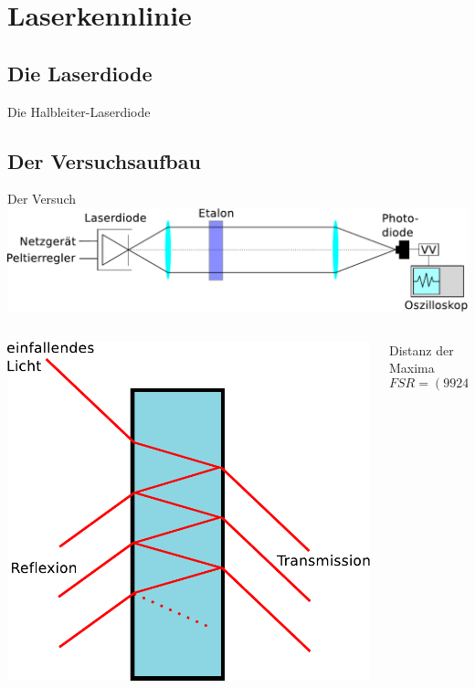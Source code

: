 \documentclass{beamer}
\begin{document}
\section{Laserkennlinie} %

\subsection{Die Laserdiode}

\begin{frame}
\begin{center}
\end{center}
\end{frame}

\begin{frame}{Die Halbleiter-Laserdiode} 
\end{frame}

\subsection{Der Versuchsaufbau}
\begin{frame}{Der Versuch}
\centering \includegraphics[width=\textwidth]{Bilder/ABLaser.pdf}
\begin{columns}
\begin{column}{4cm}
\pause \centering \includegraphics[width=\textwidth]{Bilder/Etalon.pdf}
\end{column}
\begin{column}{5cm}
Distanz der Maxima
$$ FSR = (9924 \pm 30) MHz $$
\end{column}
\end{columns}
\end{frame}
\end{document}
